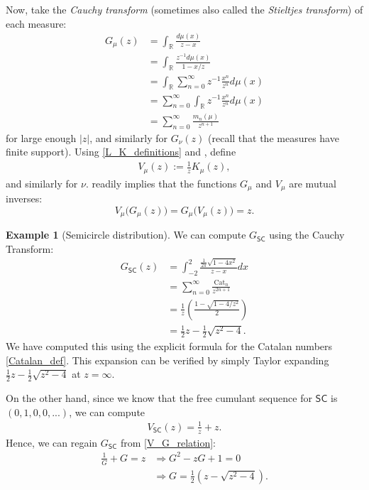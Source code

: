 \documentclass[letterpaper,11pt,oneside,reqno]{amsart}
\numberwithin{equation}{section}
\newcommand{\SC}{\mathsf{SC}}
\theoremstyle{definition}
\newtheorem{example}[proposition]{Example}
\begin{document}
Now, take the \emph{Cauchy transform} (sometimes also called the \emph{Stieltjes transform}) of each measure:
\begin{align*}
    G_\mu(z)&=\int_\mathbb{R} \frac{d\mu(x)}{z-x}\\
    &=\int_\mathbb{R} \frac{z^{-1} d\mu(x)}{1-x/z}\\
    &=\int_\mathbb{R}\sum_{n=0}^\infty z^{-1}\frac{x^n}{z^n} d\mu(x)\\
    &=\sum_{n=0}^\infty \int_\mathbb{R}z^{-1}\frac{x^n}{z^n} d\mu(x)\\
    &=\sum_{n=0}^\infty \frac{m_n(\mu)}{z^{n+1}}
\end{align*}
for large enough $|z|$, and similarly for $G_\nu(z)$
(recall that the measures have finite support).
Using \eqref{L_K_definitions} and ,
define
\begin{align*}
    V_{\mu}(z):=\frac{1}{z}K_{\mu}(z),
\end{align*}
and similarly for $\nu$. 
 readily implies that
the functions $G_\mu$ and $V_\mu$ are mutual inverses:
\begin{equation}\label{V_G_relation}
	V_\mu\big(G_\mu(z)\big)=G_\mu\big(V_\mu(z)\big)=z.
\end{equation}

\begin{example}[Semicircle distribution]\label{G_SC}
We can compute $G_{\SC}$ using the Cauchy Transform:
\begin{align*}
G_{\SC}(z)&=\int_{-2}^2 \frac{\frac{1}{2\pi}\sqrt{1-4x^2}}{z-x}dx\\
&=\sum_{n=0}^\infty \frac{\mathrm{Cat}_n}{z^{2n+1}}\\
&=\frac{1}{z}\left(\frac{1-\sqrt{1-4/z^2}}{2}\right)\\
&=\frac{1}{2}z-\frac{1}{2}\sqrt{z^2-4}.
\end{align*}
We have computed this using the explicit formula for the Catalan numbers \eqref{Catalan_def}. This expansion can be 
verified by simply Taylor expanding $\frac{1}{2}z-\frac{1}{2}\sqrt{z^2-4}$ at $z=\infty$.

On the other hand, since we know that the free cumulant sequence for $\SC$ is $(0,1,0,0,...)$, we can compute
\begin{align*}
V_{\SC}(z)=\frac{1}{z}+z.
\end{align*}
Hence, we can regain $G_{\SC}$ from \eqref{V_G_relation}:
\begin{align*}
    \frac{1}{G}+G=z & \Rightarrow G^2-zG+1=0\\
    & \Rightarrow G=\frac{1}{2}(z-\sqrt{z^2-4}).
\end{align*}
\end{example}
\end{document}
